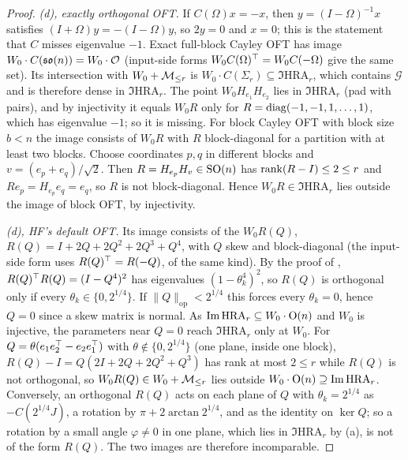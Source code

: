 \begin{proof}
\emph{(d), exactly orthogonal OFT.} If $C(\Omega)x=-x$, then $y=(I-\Omega)^{-1}x$ satisfies $(I+\Omega)y=-(I-\Omega)y$,
so $2y=0$ and $x=0$; this is the statement that $C$ misses eigenvalue $-1$. Exact full-block Cayley OFT has image
$W_0\cdot C(\mathfrak{so}(n))=W_0\cdot\mathcal O$ (input-side forms $W_0C(\Omega)^{\top}=W_0C(-\Omega)$ give the same set). Its
intersection with $W_0+\mathcal{M}_{\le r}$ is $W_0\cdot C(\Sigma_r)\subseteq\Im\mathrm{HRA}_r$, which contains $\mathcal G$ and is
therefore dense in $\Im\mathrm{HRA}_r$. The point $W_0H_{e_1}H_{e_2}$ lies in $\Im\mathrm{HRA}_r$ (pad with pairs), and by
injectivity it equals $W_0R$ only for $R=\operatorname{diag}(-1,-1,1,\dots,1)$, which has eigenvalue $-1$; so it is missing. For block
Cayley OFT with block size $b<n$ the image consists of $W_0R$ with $R$ block-diagonal for a partition with at least two
blocks. Choose coordinates $p,q$ in different blocks and $v=(e_p+e_q)/\sqrt2$. Then $R=H_{e_p}H_v\in\mathrm{SO}(n)$ has
$\operatorname{rank}(R-I)\le2\le r$ and $Re_p=H_{e_p}e_q=e_q$, so $R$ is not block-diagonal. Hence $W_0R\in\Im\mathrm{HRA}_r$ lies outside
the image of block OFT, by injectivity.

\emph{(d), HF's default OFT.} Its image consists of the $W_0R(Q)$, $R(Q)=I+2Q+2Q^2+2Q^3+Q^4$, with $Q$ skew and
block-diagonal (the input-side form uses $R(Q)^{\top}=R(-Q)$, of the same kind). By the proof of ,
$R(Q)^{\top} R(Q)=(I-Q^4)^2$ has eigenvalues $(1-\theta_k^4)^2$, so $R(Q)$ is orthogonal only if every $\theta_k\in\{0,2^{1/4}\}$.
If $\lVert Q\rVert_{\mathrm{op}}<2^{1/4}$ this forces every $\theta_k=0$, hence $Q=0$ since a skew matrix is normal. As
$\operatorname{Im}\mathrm{HRA}_r\subseteq W_0\cdot\mathrm{O}(n)$ and $W_0$ is injective, the parameters near $Q=0$ reach $\Im\mathrm{HRA}_r$
only at $W_0$. For $Q=\theta(e_1e_2^{\top}-e_2e_1^{\top})$ with $\theta\notin\{0,2^{1/4}\}$ (one plane, inside one block),
$R(Q)-I=Q(2I+2Q+2Q^2+Q^3)$ has rank at most $2\le r$ while $R(Q)$ is not orthogonal, so $W_0R(Q)\in W_0+\mathcal{M}_{\le r}$ lies outside
$W_0\cdot\mathrm{O}(n)\supseteq\operatorname{Im}\mathrm{HRA}_r$. Conversely, an orthogonal $R(Q)$ acts on each plane of $Q$ with
$\theta_k=2^{1/4}$ as $-C(2^{1/4}J)$, a rotation by $\pi+2\arctan2^{1/4}$, and as the identity on $\ker Q$; so a rotation by a
small angle $\varphi\ne0$ in one plane, which lies in $\Im\mathrm{HRA}_r$ by (a), is not of the form $R(Q)$. The two images
are therefore incomparable.


\end{proof}
